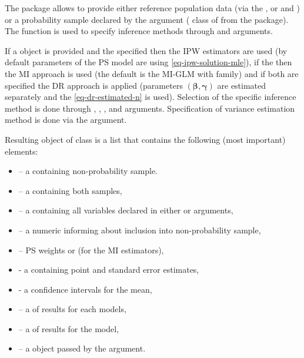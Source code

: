 \documentclass[
]{jss}
\begin{document}
The package allows to provide either reference population data (via the
, or  and ) or a
probability sample declared by the  argument
( class of from the  package). The
 function is used to specify inference methods through
 and  arguments.

If a  object is provided and the 
specified then the IPW estimators are used (by default parameters of the
PS model are using \eqref{eq-ipw-solution-mle}), if the 
then the MI approach is used (the default is the MI-GLM with
 family) and if both are specified the DR approach is
applied (parameters \((\boldsymbol{\beta}, \boldsymbol{\gamma})\) are
estimated separately and the \eqref{eq-dr-estimated-n} is used).
Selection of the specific inference method is done through
, ,
,  and
 arguments. Specification of variance estimation
method is done via the  argument.

Resulting object of class  is a list that contains the
following (most important) elements:

\begin{itemize}
\item {} -- a  containing non-probability sample.
\item {} -- a  containing both samples,
\item {} -- a  containing all variables declared in either  or  arguments,
\item {} -- a numeric  informing about inclusion into non-probability sample,
\item {} -- PS weights or  (for the MI estimators),
\item {} - a  containing point and standard error estimates,
\item {} - a  confidence intervals for the mean,
\item {} -- a  of results for each  models,
\item {} -- a  of results for the  model,
\item {} -- a  object passed by the  argument.
\end{itemize}
\end{document}
